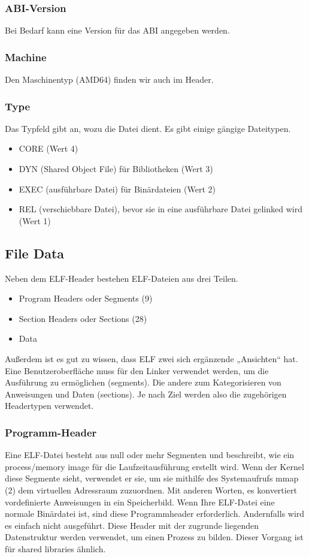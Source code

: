 \subsubsection{ABI-Version}
Bei Bedarf kann eine Version für das ABI angegeben werden.

\subsubsection{Machine}
Den Maschinentyp (AMD64) finden wir auch im Header.

\subsubsection{Type}
Das Typfeld gibt an, wozu die Datei dient. Es gibt einige gängige Dateitypen.

\begin{itemize}
\item CORE (Wert 4)
\item DYN (Shared Object File) für Bibliotheken (Wert 3)
\item EXEC (ausführbare Datei) für Binärdateien (Wert 2)
\item REL (verschiebbare Datei), bevor sie in eine ausführbare Datei gelinked wird (Wert 1)
\end{itemize}

\subsection{File Data}
Neben dem ELF-Header bestehen ELF-Dateien aus drei Teilen.

\begin{itemize}
\item Program Headers oder Segments (9)
\item Section Headers oder Sections (28)
\item Data
\end{itemize}

Außerdem ist es gut zu wissen, dass ELF zwei sich ergänzende „Ansichten“ hat. Eine Benutzeroberfläche muss für den Linker verwendet werden, um die Ausführung zu ermöglichen (segments). Die andere zum Kategorisieren von Anweisungen und Daten (sections). Je nach Ziel werden also die zugehörigen Headertypen verwendet.

\subsubsection{Programm-Header}
Eine ELF-Datei besteht aus null oder mehr Segmenten und beschreibt, wie ein process/memory image für die Laufzeitausführung erstellt wird. Wenn der Kernel diese Segmente sieht, verwendet er sie, um sie mithilfe des Systemaufrufs mmap (2) dem virtuellen Adressraum zuzuordnen. Mit anderen Worten, es konvertiert vordefinierte Anweisungen in ein Speicherbild. Wenn Ihre ELF-Datei eine normale Binärdatei ist, sind diese Programmheader erforderlich. Andernfalls wird es einfach nicht ausgeführt. Diese Header mit der zugrunde liegenden Datenstruktur werden verwendet, um einen Prozess zu bilden. Dieser Vorgang ist für shared libraries ähnlich.

